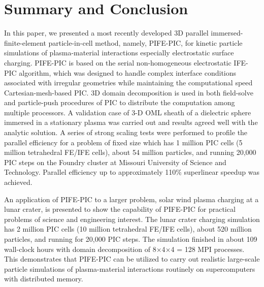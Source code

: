\documentclass{siamart171218}
\begin{document}
{}
\section{Summary and Conclusion}
\label{sec:conclusion}

In this paper, we presented a most recently developed 3D
parallel immersed-finite-element particle-in-cell method,
namely, PIFE-PIC,
for kinetic particle simulations of plasma-material interactions
especially electrostatic surface charging.
PIFE-PIC is based on the serial non-homogeneous electrostatic IFE-PIC algorithm,
which was designed to handle complex interface conditions
associated with irregular geometries
while maintaining the computational speed Cartesian-mesh-based PIC.
3D domain decomposition is used in both field-solve and particle-push procedures of PIC
to distribute the computation among multiple processors.
A validation case of 3-D OML sheath of a dielectric sphere immersed
in a stationary plasma was carried out
and results agreed well with the analytic solution.
A series of strong scaling tests were performed to profile the parallel efficiency
for a problem of fixed size
which has 1 million PIC cells (5 million tetrahedral FE/IFE cells),
about 54 million particles,
and running 20,000 PIC steps
on the Foundry cluster at Missouri University of Science and Technology.
Parallel efficiency up to approximately 110\% superlinear speedup was achieved.


An application of PIFE-PIC to a larger problem, solar wind plasma charging at a lunar crater,
is presented to show the capability of PIFE-PIC for practical problems
of science and engineering interest.
The lunar crater charging simulation has 2 million PIC cells
(10 million tetrahedral FE/IFE cells),
about 520 million particles,
and running for 20,000 PIC steps.
The simulation finished in about 109 wall-clock hours
with domain decomposition of 8$\times$4$\times$4 = 128 MPI processes.
This demonstrates that PIFE-PIC can be utilized to carry out
realistic large-scale particle simulations of plasma-material interactions
routinely on supercomputers with distributed memory.
\end{document}
